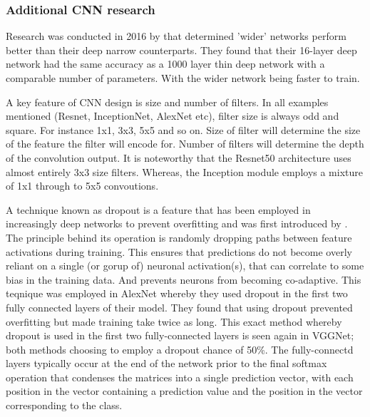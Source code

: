   \subsubsection{Additional CNN research}
    Research was conducted in 2016 by \citep{Zagoruyko} that determined 'wider' networks perform better than their deep narrow counterparts. They found that their 16-layer deep network had the same accuracy as a 1000 layer thin deep network with a comparable number of parameters. With the wider network being faster to train.
    \par
    A key feature of CNN design is size and number of filters. In all examples mentioned (Resnet, InceptionNet, AlexNet etc), filter size is always odd and square. For instance 1x1, 3x3, 5x5 and so on. Size of filter will determine the size of the feature the filter will encode for. Number of filters will determine the depth of the convolution output. It is noteworthy that the Resnet50 architecture \citep{He} uses almost entirely 3x3 size filters. Whereas, the Inception module employs a mixture of 1x1 through to 5x5 convoutions.
    \par
    A technique known as dropout is a feature that has been employed in increasingly deep networks to prevent overfitting and was first introduced by \citep{Srivastava2014}. The principle behind its operation is randomly dropping paths between feature activations during training. This ensures that predictions do not become overly reliant on a single (or gorup of) neuronal activation(s), that can correlate to some bias in the training data. And prevents neurons from becoming co-adaptive. This teqnique was employed in AlexNet \citep{Krizhevsky} whereby they used dropout in the first two fully connected layers of their model. They found that using dropout prevented overfitting but made training take twice as long. This exact method whereby dropout is used in the first two fully-connected layers is seen again in VGGNet\citep{Simonyan2015}; both methods choosing to employ a dropout chance of 50\%. The fully-connectd layers typically occur at the end of the network prior to the final softmax operation that condenses the matrices into a single prediction vector, with each position in the vector containing a prediction value and the position in the vector corresponding to the class.%
    \par
